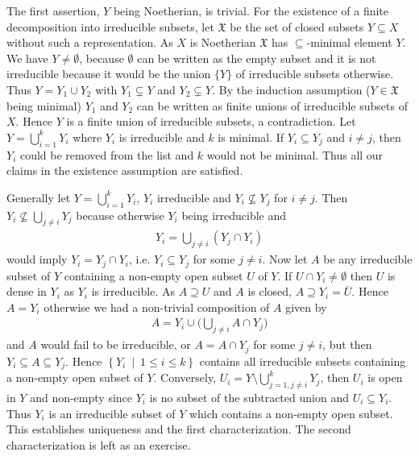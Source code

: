 \documentclass[DIV=14,parskip=full,pointednumbers]{scrartcl}
\theoremstyle{cthm}
\theoremstyle{cvarthm}
\renewenvironment{proof}[1][\proofname]
{\pushQED{\qed}\topsep0pt \partopsep0pt\trivlist\item[\hskip\labelsep\itshape #1.] }{\popQED\endtrivlist\addvspace{6pt plus 6pt}}
\theoremstyle{cdef}
\newcommand{\XX}{\mathfrak{X}}
\newcommand{\ov}{\overline}
\newcommand{\st}{\ \middle|\ }
\begin{document}
	\begin{proof}
		The first assertion, $Y$ being Noetherian, is trivial. For the existence of a finite decomposition into irreducible subsets, let $\XX$ be the set of closed subsets $Y\subseteq X$ without such a representation. As $X$ is Noetherian $\XX$ has $\subseteq $-minimal element $Y$. We have $Y\neq \emptyset$, because $\emptyset$ can be written as the empty subset and it is not irreducible because it would be the union $\{Y\}$ of irreducible subsets otherwise. Thus $Y= Y_1\cup Y_2$ with $Y_1\subsetneq Y$ and $Y_2\subsetneq Y$. By the induction assumption ($Y\in \XX$ being minimal) $Y_1$ and $Y_2$ can be written as finite unions of irreducible subsets of $X$. Hence $Y$ is a finite union of irreducible subsets, a contradiction. Let $Y=\bigcup_{i=1}^k Y_i$ where $Y_i$ is irreducible and $k$ is minimal. If $Y_i\subseteq Y_j$ and $i\neq j$, then $Y_i$ could be removed from the list and $k$ would not be minimal. Thus all our claims in the existence assumption are satisfied.
		
		Generally let $Y=\bigcup_{i=1}^kY_i$, $Y_i$ irreducible and $Y_i\not\subseteq Y_j$ for $i\neq j$. Then $Y_i\not\subseteq \bigcup_{j\not=i}Y_j$ because otherwise $Y_i$ being irreducible and
		\begin{align*}
			Y_i=\bigcup_{j\not=i}(Y_j\cap Y_i)
		\end{align*}
		would imply $Y_i=Y_j\cap Y_i$, i.e. $Y_i\subseteq Y_j$ for some $j\not=i$. Now let $A$ be any irreducible subset of $Y$ containing a non-empty open subset $U$ of $Y$. If $U\cap Y_i\neq \emptyset$ then $U$ is dense in $Y_i$ as $Y_i$ is irreducible. As $A\supseteq U$ and $A$ is closed, $A\supseteq Y_i = \ov U$. Hence $A=Y_i$ otherwise we had a non-trivial composition of $A$ given by 
		\begin{align*}
		A= Y_i \cup \bigg(\bigcup_{j\not=i} A\cap Y_j\bigg)
		\end{align*}
		and $A$ would fail to be irreducible, or $A=A\cap Y_j$ for some $j\not=i$, but then $Y_i\subseteq A\subseteq Y_j$. Hence $\left\{ Y_i\st 1\leq i \leq k\right\}$ contains all irreducible subsets containing a non-empty open subset of $Y$. Conversely, $U_i = Y\setminus \bigcup_{j=1, j\neq i}^k Y_j$, then $U_i$ is open in $Y$ and non-empty since $Y_i$ is no subset of the subtracted union and $U_i\subseteq Y_i$. Thus $Y_i$ is an irreducible subset of $Y$ which contains a non-empty open subset. This establishes uniqueness and the first characterization. The second characterization is left as an exercise.
	\end{proof}
	
\end{document}
